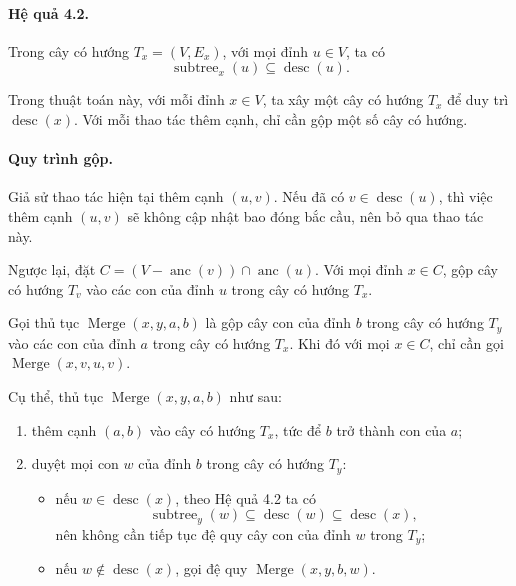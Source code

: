\documentclass[11pt]{article}
\begin{document}
\paragraph{Hệ quả 4.2.}
Trong cây có hướng \(T_x=(V,E_x)\), với mọi đỉnh \(u\in V\), ta có
\[
  \operatorname{subtree}_x(u)\subseteq\operatorname{desc}(u).
\]

Trong thuật toán này, với mỗi đỉnh \(x\in V\), ta xây một cây có hướng \(T_x\)
để duy trì \(\operatorname{desc}(x)\). Với mỗi thao tác thêm cạnh, chỉ cần gộp
một số cây có hướng.

\paragraph{Quy trình gộp.}
Giả sử thao tác hiện tại thêm cạnh \((u,v)\). Nếu đã có
\(v\in\operatorname{desc}(u)\), thì việc thêm cạnh \((u,v)\) sẽ không cập nhật
bao đóng bắc cầu, nên bỏ qua thao tác này.

Ngược lại, đặt \(C=(V-\operatorname{anc}(v))\cap\operatorname{anc}(u)\). Với
mọi đỉnh \(x\in C\), gộp cây có hướng \(T_v\) vào các con của đỉnh \(u\) trong
cây có hướng \(T_x\).

Gọi thủ tục \(\operatorname{Merge}(x,y,a,b)\) là gộp cây con của đỉnh \(b\)
trong cây có hướng \(T_y\) vào các con của đỉnh \(a\) trong cây có hướng
\(T_x\). Khi đó với mọi \(x\in C\), chỉ cần gọi
\(\operatorname{Merge}(x,v,u,v)\).

Cụ thể, thủ tục \(\operatorname{Merge}(x,y,a,b)\) như sau:
\begin{enumerate}
  \item thêm cạnh \((a,b)\) vào cây có hướng \(T_x\), tức để \(b\) trở thành
  con của \(a\);

  \item duyệt mọi con \(w\) của đỉnh \(b\) trong cây có hướng \(T_y\):
  \begin{itemize}
    \item nếu \(w\in\operatorname{desc}(x)\), theo Hệ quả 4.2 ta có
    \[
      \operatorname{subtree}_y(w)\subseteq\operatorname{desc}(w)
      \subseteq\operatorname{desc}(x),
    \]
    nên không cần tiếp tục đệ quy cây con của đỉnh \(w\) trong \(T_y\);

    \item nếu \(w\notin\operatorname{desc}(x)\), gọi đệ quy
    \(\operatorname{Merge}(x,y,b,w)\).
  \end{itemize}
\end{enumerate}
\end{document}
